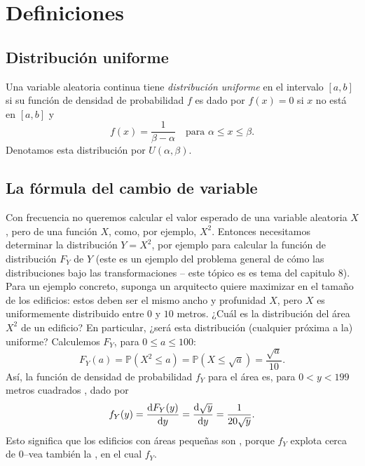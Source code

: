 
\section{Definiciones}
\label{sec:defi}

\subsection{Distribución uniforme}

\begin{definition}
  Una variable aleatoria continua tiene \textit{distribución uniforme} en el intervalo $\left[a,b\right]$ si su función de densidad de probabilidad $f$ es dado por $f(x)=0$ si $x$ no está en $\left[a,b\right]$ y
  \begin{equation*}
    f(x)=\frac{1}{\beta-\alpha}\quad\text{para }\alpha \le x\le \beta.
  \end{equation*}
 Denotamos esta distribución por $U\left(\alpha,\beta\right)$.
\end{definition}

\subsection{La fórmula del cambio de variable}
\label{sec:change}

Con frecuencia no queremos calcular el valor esperado de una variable aleatoria $X$, pero %
de una función $X$, como, por ejemplo, $X^2$. Entonces necesitamos determinar la distribución $Y=X^2$, por ejemplo para calcular la función de distribución $F_Y$ de $Y$ (este es un ejemplo del problema general de cómo las distribuciones bajo las transformaciones -- este tópico es es tema del capitulo 8). Para un ejemplo concreto, suponga un arquitecto quiere maximizar %
en el tamaño de los edificios: estos deben ser el mismo ancho y profunidad $X$, pero $X$ es uniformemente distribuido entre $0$ y $10$ metros. ¿Cuál es la distribución del área $X^2$ de un edificio? En particular, ¿será esta distribución (cualquier próxima a la) uniforme? Calculemos $F_Y$, para $0\le a\le 100$:
\begin{equation*}
  F_Y(a)=\mathds{P}\left(X^2\le a\right)=\mathds{P}\left(X\le\sqrt{a}\right)=\frac{\sqrt{a}}{10}.
\end{equation*}
Así, la función de densidad de probabilidad $f_Y$ para el área es, para $0<y<199$ metros cuadrados %
, dado por
\begin{equation*}
  f_Y(y)=\diff{F_Y(y)}{y}=\diff{\sqrt{y}}{y}=\frac{1}{20\sqrt{y}}.
\end{equation*}
Esto significa que los edificios con áreas pequeñas son %
, porque $f_Y$ explota cerca de 0--vea también la %
, en el cual %
$f_Y$.

